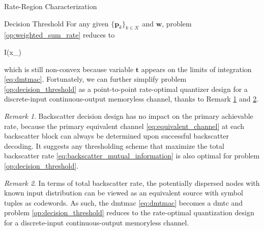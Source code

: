 \documentclass[journal,12pt,onecolumn,draftclsnofoot]{IEEEtran}
\theoremstyle{remark}
\newtheorem{remark}{Remark}
\begin{document}
\begin{section}{Rate-Region Characterization}
	\begin{subsection}{Decision Threshold}
		For any given $\{\boldsymbol{p}_k\}_{k \in \mathcal{K}}$ and $\boldsymbol{w}$, problem \eqref{op:weighted_sum_rate} reduces to
		\begin{maxi!}
			{}{I(x_{})}{\label{op:decision_threshold}}{\label{ob:decision_threshold}}
			\addConstraint{\eqref{co:sequential_threshold},}
		\end{maxi!}
		which is still non-convex because variable $\boldsymbol{t}$ appears on the limits of integration \eqref{eq:dmtmac}.
		Fortunately, we can further simplify problem \eqref{op:decision_threshold} as a point-to-point rate-optimal quantizer design for a discrete-input continuous-output memoryless channel, thanks to Remark \ref{re:backscatter_decision} and \ref{re:augmented_source}.

		\begin{remark}
			Backscatter decision design has no impact on the primary achievable rate, because the primary equivalent channel \eqref{eq:equivalent_channel} at each backscatter block can always be determined upon successful backscatter decoding.
			It suggests any thresholding scheme that maximize the total backscatter rate \eqref{eq:backscatter_mutual_information} is also optimal for problem \eqref{op:decision_threshold}.
			\label{re:backscatter_decision}
		\end{remark}

		\begin{remark}
			In terms of total backscatter rate, the potentially dispersed nodes with known input distribution can be viewed as an equivalent source with symbol tuples as codewords.
			As such, the \gls{dmtmac} \eqref{eq:dmtmac} becomes a \gls{dmtc} and problem \eqref{op:decision_threshold} reduces to the rate-optimal quantization design for a discrete-input continuous-output memoryless channel.
			\label{re:augmented_source}
		\end{remark}


\end{subsection}
\end{section}
\end{document}
